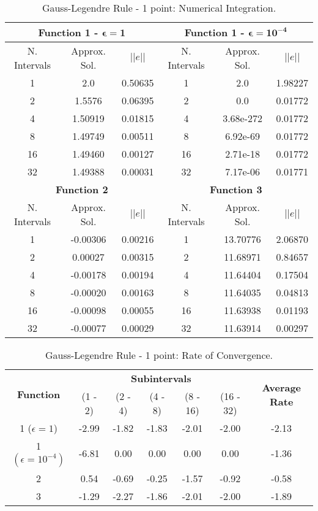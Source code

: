 \begin{table}[H]
    \centering
    \caption{Gauss-Legendre Rule - 1 point: Numerical Integration.}
    \label{tab:gauss1_int}
    \begin{tabular}{ccc|ccc}
    \hline
    \multicolumn{3}{c}{\textbf{Function 1  -} $\bm{\epsilon = 1}$} & \multicolumn{3}{c}{\textbf{Function 1 -} $\bm{\epsilon = 10^{-4}}$} \\ \hline
    N. Intervals & Approx. Sol. & $|| e ||$ & N. Intervals & Approx. Sol. & $|| e ||$ \\ \hline
    1 & 2.0 & 0.50635 & 1 & 2.0 & 1.98227 \\
    2 & 1.5576 & 0.06395 & 2 & 0.0 & 0.01772 \\
    4 & 1.50919 & 0.01815 & 4 & 3.68e-272 & 0.01772 \\
    8 & 1.49749 & 0.00511 & 8 & 6.92e-69 & 0.01772 \\
    16 & 1.49460 & 0.00127 &  16 & 2.71e-18 & 0.01772 \\
    32 & 1.49388 & 0.00031 & 32 & 7.17e-06 & 0.01771 \\ \hline
    \multicolumn{3}{c}{\textbf{Function 2}} & \multicolumn{3}{c}{\bf{Function 3}} \\ \hline
    N. Intervals & Approx. Sol. & $|| e ||$ & N. Intervals & Approx. Sol. & $|| e ||$ \\ \hline
    1 & -0.00306 & 0.00216 & 1 & 13.70776 & 2.06870\\
    2 & 0.00027& 0.00315 & 2 & 11.68971 & 0.84657\\
    4 & -0.00178 & 0.00194 & 4 & 11.64404 & 0.17504\\
    8 & -0.00020 & 0.00163 & 8 & 11.64035 & 0.04813\\
    16 & -0.00098 & 0.00055 & 16 & 11.63938 & 0.01193\\
    32 & -0.00077 & 0.00029 & 32 & 11.63914& 0.00297 \\\hline
    \end{tabular}
\end{table}
\begin{table}[H]
    \centering
    \caption{Gauss-Legendre Rule - 1 point: Rate of Convergence.}
    \label{tab:gauss1_rate}
    \begin{tabular}{ccccccc}
        \hline
        \multirow{2}{*}{\textbf{Function}} & \multicolumn{5}{c}{\textbf{Subintervals}} & \multicolumn{1}{c}{\multirow{2}{*}{\textbf{Average Rate}}} \\ \cline{2-6}
 & (1 - 2) & (2 - 4) & (4 - 8) & (8 - 16) & (16 - 32) & \multicolumn{1}{c}{} \\ \hline
        \makecell{1 \\ ($\epsilon = 1$)} & -2.99 & -1.82 & -1.83 & -2.01 & -2.00 & -2.13 \\
        \makecell{1 \\ $\left(\epsilon = 10^{-4}\right)$} & -6.81 & 0.00 & 0.00 & 0.00 & 0.00 & -1.36 \\
        2 & 0.54 & -0.69 & -0.25 & -1.57 & -0.92 & -0.58 \\ 
        3 & -1.29 & -2.27 & -1.86 & -2.01 & -2.00 & -1.89 \\ \hline
    \end{tabular}
\end{table}

